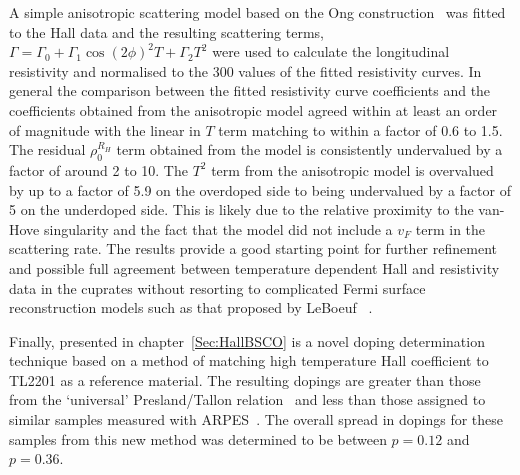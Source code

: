 A simple anisotropic scattering model based on the Ong construction~\cite{Ong1991} was fitted to the Hall data and the resulting scattering terms, $\Gamma = \Gamma_0 + \Gamma_1 \cos(2\phi)^2 T + \Gamma_2 T^2$ were used to calculate the longitudinal resistivity and normalised to the \unit{300}{\kelvin} values of the fitted resistivity curves. In general the comparison between the fitted resistivity curve coefficients and the coefficients obtained from the anisotropic model agreed within at least an order of magnitude with the linear in $T$ term matching to within a factor of 0.6 to 1.5. The residual $\rho^{R_H}_0$ term obtained from the model is consistently undervalued by a factor of around 2 to 10. The $T^2$ term from the anisotropic model is overvalued by up to a factor of 5.9  on the overdoped side to being undervalued by a factor of 5 on the underdoped side. This is likely due to the relative proximity to the van-Hove singularity and the fact that the model did not include a $v_F$ term in the scattering rate. The results provide a good starting point for further refinement and possible full agreement between temperature dependent Hall and resistivity data in the cuprates without resorting to complicated Fermi surface reconstruction models such as that proposed by LeBoeuf \etal~\cite{LeBoeuf2011}.

Finally, presented in chapter~\ref{Sec:HallBSCO} is a novel doping determination technique based on a method of matching high temperature Hall coefficient to \ac{TL2201} as a reference material. The resulting dopings are greater than those from the `universal' Presland/Tallon relation~\cite{Presland1991} and less than those assigned to similar samples measured with \ac{ARPES}~\cite{Kondo2004}. The overall spread in dopings for these samples from this new method was determined to be between $p=0.12$ and $p=0.36$.
